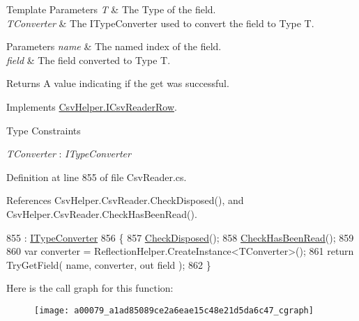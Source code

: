 \begin{DoxyTemplParams}{Template Parameters}
{\em T} & The Type of the field.\\
\hline
{\em T\-Converter} & The I\-Type\-Converter used to convert the field to Type T.\\
\hline
\end{DoxyTemplParams}

\begin{DoxyParams}{Parameters}
{\em name} & The named index of the field.\\
\hline
{\em field} & The field converted to Type T.\\
\hline
\end{DoxyParams}
\begin{DoxyReturn}{Returns}
A value indicating if the get was successful.
\end{DoxyReturn}


Implements \hyperlink{a00117_a9bd7b721a7b4acbc21050817aca71f21}{Csv\-Helper.\-I\-Csv\-Reader\-Row}.

\begin{Desc}
\item[Type Constraints]\begin{description}
\item[{\em T\-Converter} : {\em I\-Type\-Converter}]\end{description}
\end{Desc}


Definition at line 855 of file Csv\-Reader.\-cs.



References Csv\-Helper.\-Csv\-Reader.\-Check\-Disposed(), and Csv\-Helper.\-Csv\-Reader.\-Check\-Has\-Been\-Read().


\begin{DoxyCode}
855                                                                                                     : 
      \hyperlink{a00125}{ITypeConverter}
856         \{
857             \hyperlink{a00079_a6fa45a46ed1322dc1872ca2321b5edbc}{CheckDisposed}();
858             \hyperlink{a00079_a2d9249171ed1568e45d152766d364c31}{CheckHasBeenRead}();
859 
860             var converter = ReflectionHelper.CreateInstance<TConverter>();
861             \textcolor{keywordflow}{return} TryGetField( name, converter, out field );
862         \}
\end{DoxyCode}


Here is the call graph for this function\-:
\nopagebreak
\begin{figure}[H]
\begin{center}
\leavevmode
\texttt{[image: a00079\_a1ad85089ce2a6eae15c48e21d5da6c47\_cgraph]}
\end{center}
\end{figure}


